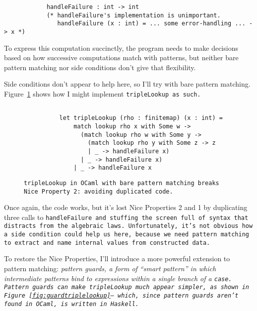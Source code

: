 \documentclass[manuscript,screen,review, 12pt, nonacm]{acmart}
\begin{document}
\begin{outline}[enumerate]
\begin{minipage}[t]{\textwidth}
\begin{verbatim}
            handleFailure : int -> int 
            (* handleFailure's implementation is unimportant.
               handleFailure (x : int) = ... some error-handling ... -> x *)  

        \end{verbatim}
    \end{minipage}

    To express this computation succinctly, the program needs to make decisions
    based on how successive computations match with patterns, but neither bare
    pattern matching nor side conditions don't give that flexibility. 
    
    Side conditions don't appear to help here, so I'll try with bare pattern
    matching. Figure~\ref{fig:pmtriplelookup} shows how I might implement
    \tt{tripleLookup} as such. 

    \begin{figure}[ht]
        \begin{verbatim}

          let tripleLookup (rho : finitemap) (x : int) =
              match lookup rho x with Some w -> 
                (match lookup rho w with Some y -> 
                  (match lookup rho y with Some z -> z
                  | _ -> handleFailure x)
                | _ -> handleFailure x)
              | _ -> handleFailure x
            \end{verbatim}
        \caption{\tt{tripleLookup} in OCaml with bare pattern matching breaks
                    Nice Property 2: avoiding duplicated code. } 
                    
        \label{fig:pmtriplelookup}
    \end{figure}

    Once again, the code works, but it's lost Nice Properties 2 and 1 by
    duplicating three calls to \tt{handleFailure} and stuffing the screen full
    of syntax that distracts from the algebraic laws. Unfortunately, it's not
    obvious how a side condition could help us here, because we need pattern
    matching to extract and name internal values from constructed data.

    To restore the Nice Properties, I'll introduce a more powerful extension to
    pattern matching: \it{pattern guards}, a form of “smart pattern” in which
    intermediate patterns bind to expressions within a single branch of a
    \tt{case}. Pattern guards can make \tt{tripleLookup} \it{much} appear
    simpler, as shown in Figure~\ref{fig:guardtriplelookup}-- which, since
    pattern guards aren't found in OCaml, is written in Haskell.


\end{outline}
\end{document}

